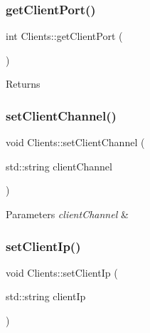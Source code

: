 \subsubsection{\texorpdfstring{get\+Client\+Port()}{getClientPort()}}
{\footnotesize\ttfamily int Clients\+::get\+Client\+Port (\begin{DoxyParamCaption}{ }\end{DoxyParamCaption})}





\begin{DoxyReturn}{Returns}

\end{DoxyReturn}
\mbox{\label{class_clients_a0137730d1ce598d40b185ad666d103b3}} 
\subsubsection{\texorpdfstring{set\+Client\+Channel()}{setClientChannel()}}
{\footnotesize\ttfamily void Clients\+::set\+Client\+Channel (\begin{DoxyParamCaption}\item[{std\+::string}]{client\+Channel }\end{DoxyParamCaption})}






\begin{DoxyParams}{Parameters}
{\em client\+Channel} & \\
\hline
\end{DoxyParams}
\mbox{\label{class_clients_ac43dfa53c63987a37c9b92b1535843d6}} 
\subsubsection{\texorpdfstring{set\+Client\+Ip()}{setClientIp()}}
{\footnotesize\ttfamily void Clients\+::set\+Client\+Ip (\begin{DoxyParamCaption}\item[{std\+::string}]{client\+Ip }\end{DoxyParamCaption})}






